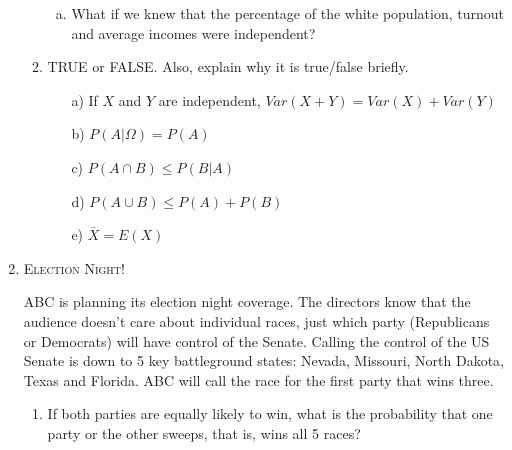 \documentclass[10pt,letterpaper]{article}
\theoremstyle{definition}
\numberwithin{equation}{section}
\begin{document}
\begin{enumerate}[I]
\begin{enumerate}[1)]
\begin{enumerate}[a)]
\item What if we knew that the percentage of the white population, turnout and average incomes were independent? 
\vfill

\end{enumerate}
\bigskip

\pagebreak

\item TRUE or FALSE. Also, explain why it is true/false briefly.
\begin{enumerate}
\item[a)] If $X$ and $Y$ are independent, $Var(X+Y)=Var(X)+Var(Y)$
\vfill

\item[b)] $P(A|\Omega)=P(A)$
\vfill

\item[c)] $P(A\cap B) \leq P(B|A)$
\vfill

\item[d)] $P(A\cup B)\leq P(A)+P(B)$
\vfill

\item[e)] $\bar{X}=E(X)$
\vfill

\end{enumerate}

\end{enumerate}
\pagebreak
\item \textsc{Election Night!} 

ABC is planning its election night coverage.  The directors know that the audience doesn't care about individual races, just which party (Republicans or Democrats) will have control of the Senate. Calling the control of the US Senate is down to 5 key battleground states:  Nevada, Missouri, North Dakota, Texas and Florida.  ABC will call the race for the first party that wins three.   
\begin{enumerate}[1)]
\item  If both parties are equally likely to win, what is the probability that one party or the other sweeps, that is, wins all 5 races?
\vfill
\end{enumerate}


\end{enumerate}
\end{document}
